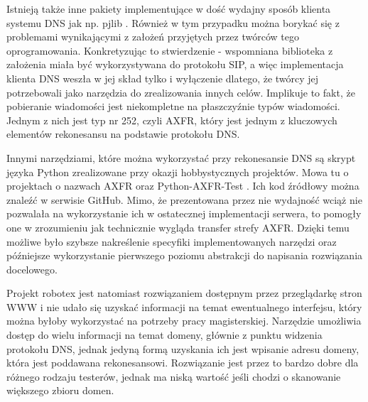 Istnieją także inne pakiety implementujące w dość wydajny sposób klienta systemu DNS jak np. pjlib \cite{pjlib}. Również w tym
przypadku można borykać się z problemami wynikającymi z założeń przyjętych przez twórców tego oprogramowania. Konkretyzując to
stwierdzenie - wspomniana biblioteka z założenia miała być wykorzystywana do protokołu SIP, a więc implementacja klienta DNS
weszła w jej skład tylko i wyłączenie dlatego, że twórcy jej potrzebowali jako narzędzia do zrealizowania innych celów.
Implikuje to fakt, że pobieranie wiadomości jest niekompletne na płaszczyźnie typów wiadomości. Jednym z nich jest typ nr 252,
czyli AXFR, który jest jednym z kluczowych elementów rekonesansu na podstawie protokołu DNS.

Innymi narzędziami, które można wykorzystać przy rekonesansie DNS są skrypt języka Python zrealizowane przy okazji hobbystycznych
projektów. Mowa tu o projektach o nazwach AXFR \cite{asg-axfr} oraz Python-AXFR-Test \cite{python_axfr_test}.
Ich kod źródłowy można znaleźć w serwisie GitHub. Mimo, że prezentowana przez nie wydajność wciąż nie pozwalała na wykorzystanie
ich w ostatecznej implementacji serwera, to pomogły one w zrozumieniu jak technicznie wygląda transfer strefy AXFR. Dzięki temu
możliwe było szybsze nakreślenie specyfiki implementowanych narzędzi oraz późniejsze wykorzystanie pierwszego poziomu
abstrakcji do napisania rozwiązania docelowego.

Projekt robotex \cite{robotex} jest natomiast rozwiązaniem dostępnym przez przeglądarkę stron WWW i nie udało się uzyskać informacji
na temat ewentualnego interfejsu, który można byłoby wykorzystać na potrzeby pracy magisterskiej. Narzędzie umożliwia dostęp do
wielu informacji na temat domeny, głównie z punktu widzenia protokołu DNS, jednak jedyną formą uzyskania ich jest wpisanie
adresu domeny, która jest poddawana rekonesansowi. Rozwiązanie jest przez to bardzo dobre dla różnego rodzaju testerów, jednak
ma niską wartość jeśli chodzi o skanowanie większego zbioru domen.

